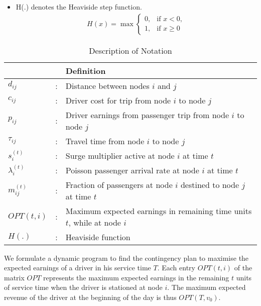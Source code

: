 \begin{itemize}
\item H(.) denotes the Heaviside step function. \\
\begin{eqnarray*}
H(x) = \max
    \begin{cases}
    0, & \text{if } x < 0, \\
    1, & \text{if } x \geq 0
    \end{cases}
\end{eqnarray*}
\end{itemize}

\begin {table}[h]
\caption {Description of Notation} 
\label{tab:notation} 
\centering
\begin{tabular}{l c p{}}
\toprule
       &                  & Definition \\
\midrule
$d_{ij}$&:& Distance between nodes $i$ and $j$  \\
$c_{ij}$&:& Driver cost for trip from node $i$ to node $j$ \\
$p_{ij}$&:& Driver earnings from passenger trip from node $i$ to node $j$ \\
$\tau_{ij}$&:& Travel time from node $i$ to node $j$  \\
$s_{i}^{(t)}$&:& Surge multiplier active at node $i$ at time $t$ \\
$\lambda_{i}^{(t)}$&:& Poisson passenger arrival rate at node $i$ at time $t$ \\
$m_{ij}^{(t)}$&:& Fraction of passengers at node $i$ destined to node $j$ at time $t$ \\
$OPT(t,i)$&:& Maximum expected earnings in remaining time units $t$, while at node $i$ \\
$H(.)$&:& Heaviside function \\
\bottomrule
\end{tabular}
\end {table}


We formulate a dynamic program to find the contingency plan to maximise the expected earnings of a driver in his service time $T$. Each entry $OPT(t,i)$ of the matrix $OPT$ represents the maximum expected earnings in the remaining $t$ units of service time when the driver is stationed at node $i$. The maximum expected revenue of the driver at the beginning of the day is thus $OPT(T, v_0)$.


